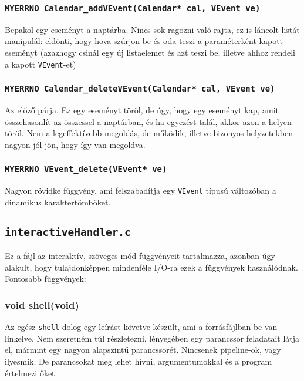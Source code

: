 \documentclass[a4paper]{article}
\begin{document}
\subsubsection{\texttt{MYERRNO Calendar\_addVEvent(Calendar* cal, VEvent ve)}}

Bepakol egy eseményt a naptárba. Nincs sok ragozni való rajta, ez is láncolt listát manipulál: eldönti, hogy hova szúrjon be és oda teszi a paraméterként kapott eseményt (azazhogy csinál egy új listaelemet és azt teszi be, illetve ahhoz rendeli a kapott \texttt{VEvent}-et)

\subsubsection{\texttt{MYERRNO Calendar\_deleteVEvent(Calendar* cal, VEvent ve)}}

Az előző párja. Ez egy eseményt töröl, de úgy, hogy egy eseményt kap, amit összehasonlít az összessel a naptárban, és ha egyezést talál, akkor azon a helyen töröl. Nem a legeffektívebb megoldás, de működik, illetve bizonyos helyzetekben nagyon jól jön, hogy így van megoldva.

\subsubsection{\texttt{MYERRNO VEvent\_delete(VEvent* ve)}}

Nagyon rövidke függvény, ami felszabadítja egy \texttt{VEvent} típusú változóban a dinamikus karaktertömböket.

\subsection{\texttt{interactiveHandler.c}}

Ez a fájl az interaktív, szöveges mód függvényeit tartalmazza, azonban úgy alakult, hogy tulajdonképpen mindenféle I/O-ra ezek a függvények használódnak. Fontosabb függvények:

\subsubsection{void shell(void)}

Az egész \texttt{shell} dolog egy leírást követve készült, ami a forrásfájlban be van linkelve. Nem szeretném túl részletezni, lényegében egy parancssor feladatait látja el, mármint egy nagyon alapszintű parancssorét. Nincsenek pipeline-ok, vagy ilyesmik. De parancsokat meg lehet hívni, argumentumokkal és a program értelmezi őket.
\end{document}
